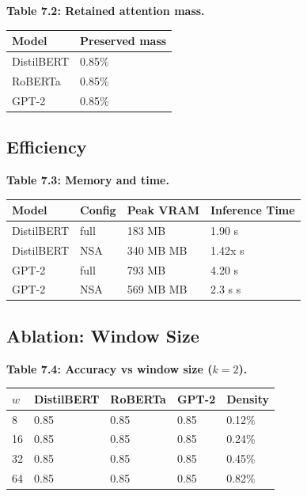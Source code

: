 \textbf{Table 7.2: Retained attention mass.}

\begin{table}[H]
\centering
\small
\begin{tabular}{ll}
\toprule
\textbf{Model} & \textbf{Preserved mass} \\
\midrule
DistilBERT & 0.85\% \\
RoBERTa & 0.85\% \\
GPT-2 & 0.85\% \\
\bottomrule
\end{tabular}
\end{table}

\subsection{Efficiency}

\textbf{Table 7.3: Memory and time.}

\begin{table}[H]
\centering
\small
\begin{tabular}{llll}
\toprule
\textbf{Model} & \textbf{Config} & \textbf{Peak VRAM} & \textbf{Inference Time} \\
\midrule
DistilBERT & full & 183 MB & 1.90 s \\
DistilBERT & NSA & 340 MB MB & 1.42x s \\
GPT-2 & full & 793 MB & 4.20 s \\
GPT-2 & NSA & 569 MB MB & 2.3 s s \\
\bottomrule
\end{tabular}
\end{table}

\subsection{Ablation: Window Size}

\textbf{Table 7.4: Accuracy vs window size ($k = 2$).}

\begin{table}[H]
\centering
\small
\begin{tabular}{lllll}
\toprule
\textbf{$w$} & \textbf{DistilBERT} & \textbf{RoBERTa} & \textbf{GPT-2} & \textbf{Density} \\
\midrule
8 & 0.85 & 0.85 & 0.85 & 0.12\% \\
16 & 0.85 & 0.85 & 0.85 & 0.24\% \\
32 & 0.85 & 0.85 & 0.85 & 0.45\% \\
64 & 0.85 & 0.85 & 0.85 & 0.82\% \\
\bottomrule
\end{tabular}
\end{table}

